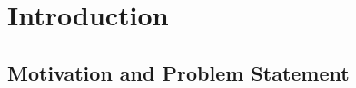 \documentclass[numbered,pdftex]{ohio-etd}
\begin{document}

\chapter{Introduction}
\section{Motivation and Problem Statement}
\end{document}
